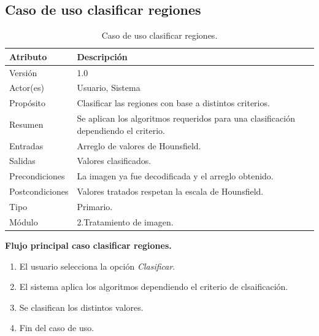 \documentclass[12pt]{report}
\begin{document}
\subsection{Caso de uso clasificar regiones}
\begin{table}[H]
\begin{center}
\begin{tabular}{|p{25mm}|p{60mm}|}
\hline
Atributo & Descripción\\
\hline \hline 
Versión & 1.0\\
\hline
Actor(es) & Usuario, Sistema\\
\hline
Propósito & Clasificar las regiones con base a distintos criterios.\\
\hline
Resumen & Se aplican los algoritmos requeridos para una clasificación dependiendo el criterio.\\
\hline
Entradas & Arreglo de valores de Hounsfield.\\
\hline
Salidas & Valores clasificados.\\
\hline
Precondiciones & La imagen ya fue decodificada y el arreglo obtenido.\\
\hline
Postcondiciones & Valores tratados respetan la escala de Hounsfield.\\
\hline
Tipo & Primario.\\
\hline 
Módulo & 2.Tratamiento de imagen.\\
\hline
\end{tabular}
\caption{Caso de uso clasificar regiones.}
\end{center}
\end{table}

\textbf{Flujo principal caso clasificar regiones. }
\begin{enumerate}
\item El usuario selecciona la opción \textit{Clasificar}.
\item El sistema aplica los algoritmos dependiendo el criterio de clsaificación.
\item Se clasifican los distintos valores.
\item Fin del caso de uso.
\end{enumerate}
\end{document}
